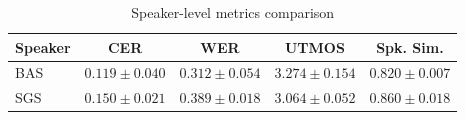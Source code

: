 \begin{table}[htbp]
\centering
\caption{Speaker-level metrics comparison}
\label{tab:speaker_comparison}
\begin{tabular}{lcccc}
\toprule
Speaker & CER & WER & UTMOS & Spk. Sim. \\
\midrule
BAS & $0.119 \pm 0.040$ & $0.312 \pm 0.054$ & $3.274 \pm 0.154$ & $0.820 \pm 0.007$ \\
SGS & $0.150 \pm 0.021$ & $0.389 \pm 0.018$ & $3.064 \pm 0.052$ & $0.860 \pm 0.018$ \\
\bottomrule
\end{tabular}
\end{table}